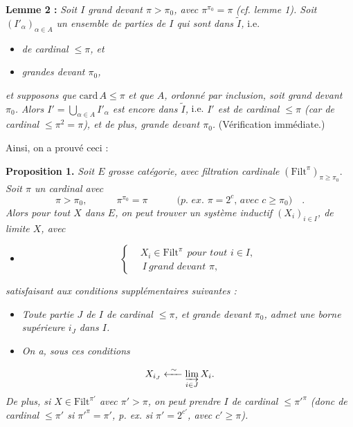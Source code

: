 \documentclass[11pt]{article}
\newcommand{\printedpage}[1]{\marginpar{\footnotesize p.~#1}}
\newcommand{\msp}[1]{\marginpar{\footnotesize [#1]}}
\newcommand{\Filt}{\mathrm{Filt}}
\newcommand{\card}{\mathrm{card}\,}
\begin{document}
\msp{page 83}
\textbf{Lemme 2 :} \textit{Soit $I$ grand devant $\pi>\pi_0$, avec $\pi^{\pi_0}=\pi$} \textit{(cf. lemme 1). Soit $(I'_\alpha)_{\alpha\in A}$ un ensemble de parties de $I$ qui sont dans $\tilde I$,} i.e.

\begin{itemize}
\item[a)] \textit{de cardinal $\le\pi$, et}
\item[b)] \textit{grandes devant $\pi_0$,}
\end{itemize}

\textit{et supposons que} $\card A\le\pi$ \textit{et que $A$, ordonné par inclusion, soit grand devant $\pi_0$. Alors $I'=\bigcup_{\alpha\in A} I'_\alpha$ est encore dans $\tilde I$,} i.e. \textit{$I'$ est de cardinal $\le\pi$ (car de cardinal $\le\pi^2=\pi$), et de plus, grande devant $\pi_0$.} (Vérification immédiate.)

Ainsi, on a prouvé ceci :

\textbf{Proposition 1.} \textit{Soit $E$} \textit{grosse catégorie, avec filtration cardinale} $(\Filt^\pi)_{\pi\ge\pi_0}$. \textit{Soit $\pi$ un cardinal avec}
\[
\pi>\pi_0, \qquad\quad \pi^{\pi_0}=\pi \qquad\quad \textit{(p. ex. $\pi=2^c$, avec $c\ge\pi_0$)} \quad .
\]
\textit{Alors pour tout $X$ dans $E$, on peut trouver un système inductif $(X_i)_{i\in I}$, de limite $X$, avec}

\begin{itemize}
\item[a)] \[ \left\{ \begin{aligned} & X_i\in\Filt^\pi \ \ \textit{pour tout $i\in I$,} \\ & \ I \ \textit{grand devant $\pi$,} \end{aligned} \right. \]
\end{itemize}

\textit{satisfaisant aux conditions supplémentaires suivantes :}

\begin{itemize}
\item[b)] \textit{Toute partie $J$ de $I$ de cardinal $\le\pi$, et grande devant $\pi_0$, admet une borne supérieure $i_J$ dans $I$.}
\item[c)] \textit{On a, sous ces conditions}
\end{itemize}

\printedpage{46}
\msp{page 84}
\[
X_{i_J} \xleftarrow{\ \sim\ } \varinjlim_{i\in J} X_i .
\]
\textit{De plus, si $X\in\Filt^{\pi'}$ avec $\pi'>\pi$, on peut prendre $I$ de cardinal $\le\pi'^{\pi}$ (donc de cardinal $\le\pi'$ si $\pi'^{\pi}=\pi'$, p. ex. si $\pi'=2^{c'}$, avec $c'\ge\pi$).}
\end{document}
